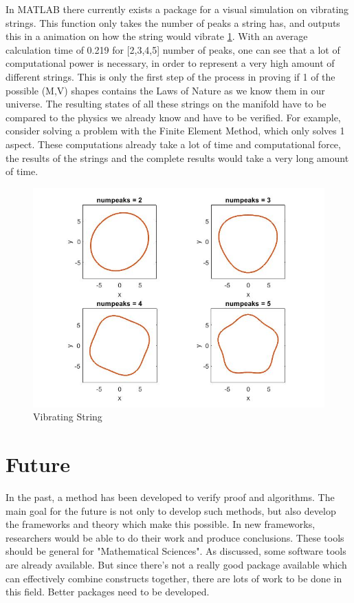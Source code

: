 \documentclass[../paper.tex]{subfiles}
\begin{document}
In MATLAB there currently exists a package for a visual simulation on vibrating strings. This function only takes the number of peaks a string has, and outputs this in a animation on how the string would vibrate \ref{Vibrating String}. With an average calculation time of 0.219 for [2,3,4,5] number of peaks, one can see that a lot of computational power is necessary, in order to represent a very high amount of different strings. This is only the first step of the process in proving if 1 of the possible (M,V) shapes contains the Laws of Nature as we know them in our universe. The resulting states of all these strings on the manifold have to be compared to the physics we already know and have to be verified. For example, consider solving a problem with the Finite Element Method, which only solves 1 aspect. These computations already take a lot of time and computational force, the results of the strings and the complete results would take a very long amount of time.

\begin{figure}[!htb]
\centering
\includegraphics[scale = 0.5]{Computational Problems/vibratingstring.jpg}
\caption{Vibrating String}
\label{Vibrating String}
\end{figure}

\section{Future}
In the past, a method has been developed to verify proof and algorithms. The main goal for the future is not only to develop such methods, but also develop the frameworks and theory which make this possible. In new frameworks, researchers would be able to do their work and produce conclusions. These tools should be general for "Mathematical Sciences". As discussed, some software tools are already available. But since there's not a really good package available which can effectively combine constructs together, there are lots of work to be done in this field. Better packages need to be developed. 
\end{document}

